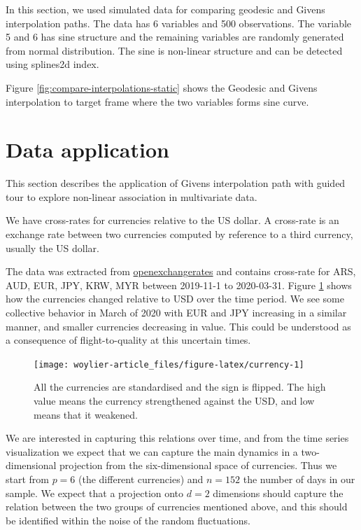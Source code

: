 In this section, we used simulated data for comparing geodesic and Givens interpolation paths. The data has 6 variables and 500 observations. The variable 5 and 6 has sine structure and the remaining variables are randomly generated from normal distribution. The sine is non-linear structure and can be detected using splines2d index.

Figure \ref{fig:compare-interpolations-static} shows the Geodesic and Givens interpolation to target frame where the two variables forms sine curve.

\hypertarget{data-application}{%
\section{Data application}\label{data-application}}

This section describes the application of Givens interpolation path with guided tour to explore non-linear association in multivariate data.

We have cross-rates for currencies relative to the US dollar. A cross-rate is an exchange rate between two currencies computed by reference to a third currency, usually the US dollar.

The data was extracted from \href{https://openexchangerates.org}{openexchangerates} and contains cross-rate for ARS, AUD, EUR, JPY, KRW, MYR between 2019-11-1 to 2020-03-31. Figure \ref{fig:currency} shows how the currencies changed relative to USD over the time period. We see some collective behavior in March of 2020 with EUR and JPY increasing in a similar manner, and smaller currencies decreasing in value. This could be understood as a consequence of flight-to-quality at this uncertain times.

\begin{figure}
\texttt{[image: woylier-article\_files/figure-latex/currency-1]} \caption{All the currencies are standardised and the sign is flipped. The high value means the currency strengthened against the USD, and low means that it weakened.}\label{fig:currency}
\end{figure}

We are interested in capturing this relations over time, and from the time series visualization we expect that we can capture the main dynamics in a two-dimensional projection from the six-dimensional space of currencies. Thus we start from \(p=6\) (the different currencies) and \(n=152\) the number of days in our sample. We expect that a projection onto \(d=2\) dimensions should capture the relation between the two groups of currencies mentioned above, and this should be identified within the noise of the random fluctuations.

